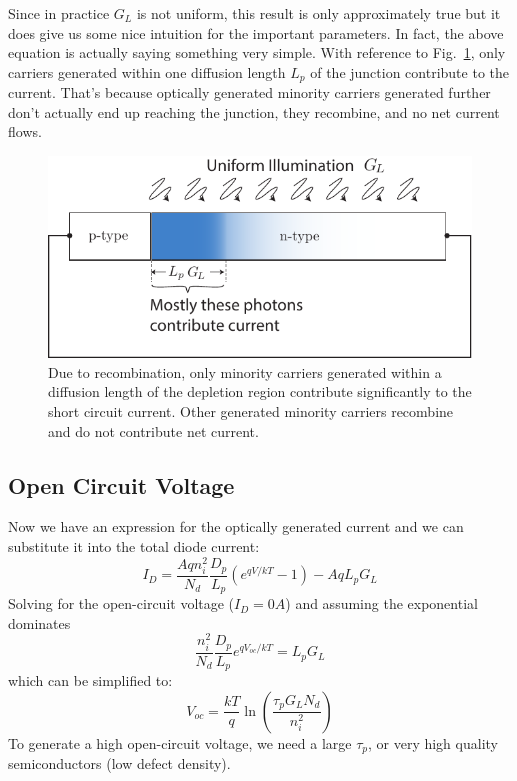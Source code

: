 Since in practice $G_L$ is not uniform, this result is only approximately true but it does give us some nice intuition for the important parameters.   In fact, the above equation is actually saying something very simple.  With reference to Fig.~\ref{fig:solar_cell_region}, only carriers generated within one diffusion length $L_p$ of the junction contribute to the current.  That's because optically generated minority carriers generated further don't actually end up reaching the junction, they recombine, and no net current flows.
\begin{figure}[tb]
\centering
\includegraphics[width=.5\columnwidth]{solar_cell_region}
\caption{Due to recombination, only minority carriers generated within a diffusion length of the depletion region contribute significantly to the short circuit current.  Other generated minority carriers recombine and do not contribute net current.}
\label{fig:solar_cell_region}
\end{figure}
\subsection{Open Circuit Voltage}
Now we have an expression for the optically generated current and we can substitute it into the total diode current:
    \begin{equation} 
        I_D = \frac{A q n_i^2}{N_d} \frac{D_p}{L_p}  (e^{qV/kT} - 1) - A q L_p G_L 
    \end{equation}
Solving for the open-circuit voltage ($I_D = 0A$) and assuming the exponential dominates
    \begin{equation} 
        \frac{  n_i^2}{N_d} \frac{D_p}{L_p}  e^{qV_{oc} /kT}  =  L_p G_L 
    \end{equation}
which can be simplified to:
    \begin{equation} 
        V_{oc} = \frac{kT}{q} \ln \left( \frac{\tau_p G_L N_d}{n_i^2} \right) 
    \end{equation}
To generate a high open-circuit voltage, we need a large $\tau_p$, or very high quality semiconductors (low defect density).
